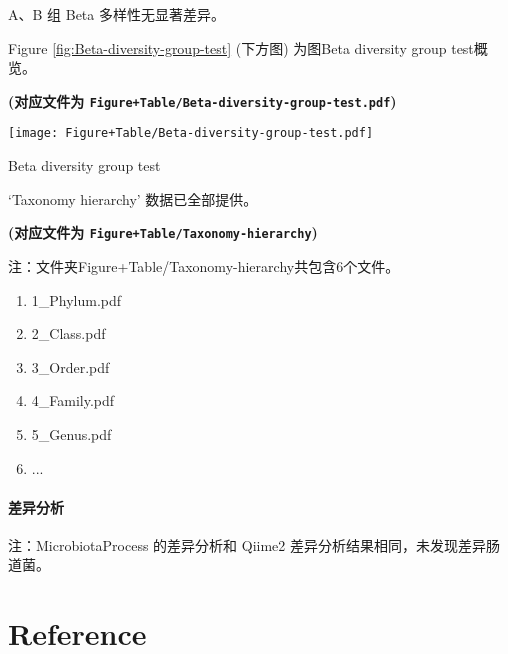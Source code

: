 \documentclass[
]{article}
\providecommand{\tightlist}{%
  \setlength{\itemsep}{0pt}\setlength{\parskip}{0pt}}
\begin{document}
A、B 组 Beta 多样性无显著差异。

Figure \ref{fig:Beta-diversity-group-test} (下方图) 为图Beta diversity group test概览。

\textbf{(对应文件为 \texttt{Figure+Table/Beta-diversity-group-test.pdf})}

\def\@captype{figure}
\begin{center}
\texttt{[image: Figure+Table/Beta-diversity-group-test.pdf]}
\caption{Beta diversity group test}\label{fig:Beta-diversity-group-test}
\end{center}

`Taxonomy hierarchy' 数据已全部提供。

\textbf{(对应文件为 \texttt{Figure+Table/Taxonomy-hierarchy})}

\begin{center}\begin{tcolorbox}[colback=gray!10, colframe=gray!50, width=0.9\linewidth, arc=1mm, boxrule=0.5pt]注：文件夹Figure+Table/Taxonomy-hierarchy共包含6个文件。

\begin{enumerate}\tightlist
\item 1\_Phylum.pdf
\item 2\_Class.pdf
\item 3\_Order.pdf
\item 4\_Family.pdf
\item 5\_Genus.pdf
\item ...
\end{enumerate}\end{tcolorbox}
\end{center}

\hypertarget{ux5deeux5f02ux5206ux6790}{%
\paragraph{差异分析}\label{ux5deeux5f02ux5206ux6790}}

注：MicrobiotaProcess 的差异分析和 Qiime2 差异分析结果相同，未发现差异肠道菌。

\hypertarget{bibliography}{%
\section*{Reference}\label{bibliography}}
\end{document}
